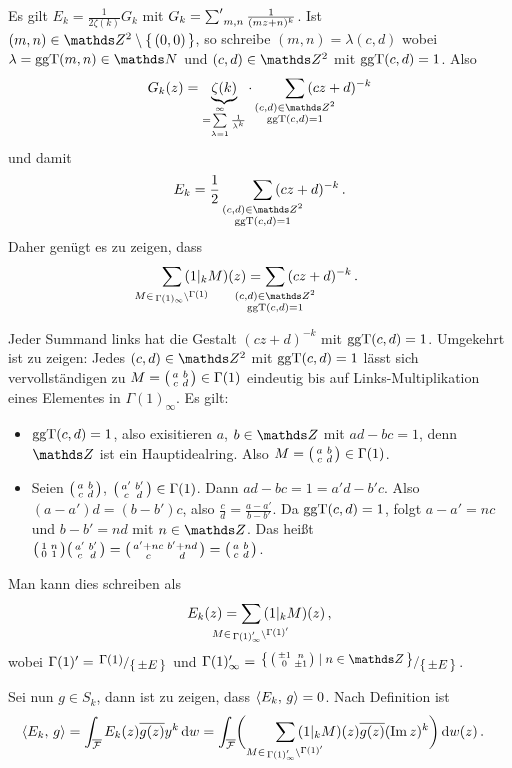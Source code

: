\begin{bewe}
\begin{bewe}
	Es gilt $E_k = \frac{1}{2\zeta(k)} G_k$ mit $G_k = \sumprime_{m,n} \frac{1}{(mz+n)^k}$.
	Ist $(m,n) \in \ZZ^2\setminus\Set{(0,0)}$, so schreibe $(m,n) = \lambda (c,d)$ wobei $\lambda = \ggt(m,n) \in \NN$ und $(c,d) \in \ZZ^2$ mit $\operatorname{ggT}(c,d) = 1$.
	Also
	\[
		G_k(z)
		= \underbrace{\zeta(k)}_{= \sum\limits_{\lambda=1}^\infty \frac{1}{\lambda^k}} \cdot \smashoperator[r]{\sum_{\substack{(c,d) \in \ZZ^2 \\ \ggt(c,d) = 1}}} \, (cz+d)^{-k}
	\]
	und damit
	\[
		E_k = \frac{1}{2} \smashoperator[r]{\sum_{\substack{(c,d) \in \ZZ^2 \\ \ggt(c,d) = 1}}} \, (cz+d)^{-k}
		\,.
	\]
	Daher genügt es zu zeigen, dass
	\[
		\smashoperator{\sum_{M \in \linksmodulo{\Gamma(1)_\infty}{\Gamma(1)}}} \, (1|_k M)(z)
		= \smashoperator{\sum_{\substack{(c,d) \in \ZZ^2 \\ \ggt(c,d) = 1}}} \, (cz+d)^{-k}
		\,.
	\]
	
	Jeder Summand links hat die Gestalt $(cz+d)^{-k}$ mit $\operatorname{ggT}(c,d) = 1$.
	Umgekehrt ist zu zeigen:
	Jedes $(c,d) \in \ZZ^2$ mit $\operatorname{ggT}(c,d) = 1$ lässt sich vervollständigen zu $M = \mymat abcd \in \Gamma(1)$ eindeutig bis auf Links-Multiplikation eines Elementes in $\Gamma(1)_\infty$.
	Es gilt:
	
	\begin{itemize}
		\item $\operatorname{ggT}(c,d) = 1$, also exisitieren $a$, $b \in \ZZ$ mit $ad - bc = 1$, denn $\ZZ$ ist ein Hauptidealring.
		Also $M = \mymat abcd \in \Gamma(1)$.
		
		\item Seien $\mymat abcd$, $\mymat {a'}{b'}cd \in \Gamma(1)$. Dann $ad-bc = 1 = a'd-b'c$.
		Also $(a-a') d = (b-b')c$, also $\frac{c}{d} = \frac{a-a'}{b-b'}$.
		Da $\operatorname{ggT}(c,d) = 1$, folgt $a-a' = nc$ und $b-b' = nd$ mit $n \in \ZZ$.
		Das heißt $\mymat 1n01 \mymat{a'}{b'}cd = \mymat {a'+nc}{b'+nd}c{d} = \mymat abcd$.
	\end{itemize}
\end{bewe}

	Man kann dies schreiben als
	\[
		E_k(z)
		= \smashoperator{\sum_{M \in \linksmodulo{\Gamma(1)_\infty'}{\Gamma(1)'}}} \, (1|_k M)(z)\,,
	\]
	wobei $\Gamma(1)' = \modulo{\Gamma(1)}{\Set{\pm E}}$ und $\Gamma(1)'_\infty = \modulo{\Set{\mymat{\pm1}n0{\pm1} \mid n \in \ZZ}}{\Set{\pm E}}$.

	Sei nun $g \in S_k$, dann ist zu zeigen, dass $\scalarprd{E_k}g = 0$. 
	Nach Definition ist
	\begin{align*}
		\scalarprd{E_k}g &= \int_{\closure \F} E_k(z) \conj{g(z)} y^k \opd w
		= \int_{\closure \F} \biggl(\smashoperator[r]{\sum_{M \in \linksmodulo{\Gamma(1)_\infty'}{\Gamma(1)'}}} \, (1|_kM)(z) \conj{g(z)} (\Im z)^k \biggr) \opd w(z)
		\,.
	\end{align*}
	

\end{bewe}
